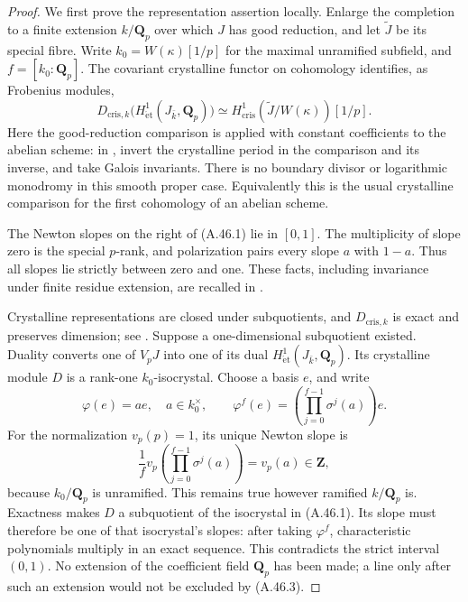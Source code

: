\begin{proof}
We first prove the representation assertion locally. Enlarge the
completion to a finite extension \(k/\mathbf Q_p\) over which \(J\)
has good reduction, and let \(\widetilde J\) be its special fibre.
Write \(k_0=W(\kappa)[1/p]\) for the maximal unramified subfield,
and \(f=[k_0:\mathbf Q_p]\). The covariant crystalline functor
on cohomology identifies, as Frobenius modules,
\[
 D_{\mathrm{cris},k}\bigl(H^1_{\acute{\mathrm e}\mathrm t}
              (J_{\bar k},\mathbf Q_p)\bigr)
       \simeq H^1_{\mathrm{cris}}(\widetilde J/W(\kappa))[1/p].
                                                        \tag{A.46.1}
\]
Here the good-reduction comparison is applied with constant
coefficients to the abelian scheme: in
\cite[Section 5, Corollary 4 and the subsequent Remarks 1--5,
printed pp.256--260]{RootFaltings2002}, invert the crystalline period
in the comparison and its inverse, and take Galois invariants.
There is no boundary divisor or logarithmic monodromy in this
smooth proper case. Equivalently this is the usual crystalline
comparison for the first cohomology of an abelian scheme.

The Newton slopes on the right of (A.46.1) lie in \([0,1]\).
The multiplicity of slope zero is the special \(p\)-rank, and
polarization pairs every slope \(a\) with \(1-a\).
Thus all slopes lie strictly between zero and one. These facts,
including invariance under finite residue extension, are recalled
in \cite[Sections 2.2.1 and 2.2.3]{RootAchterPries2013}.

Crystalline representations are closed under subquotients, and
\(D_{\mathrm{cris},k}\) is exact and preserves dimension;
see \cite[Theorem 5.2.1(1)--(3) and Proposition 9.1.6]{fghBrinonConrad}.
Suppose a one-dimensional subquotient existed. Duality converts
one of \(V_pJ\) into one of its dual
\(H^1_{\acute{\mathrm e}\mathrm t}(J_{\bar k},\mathbf Q_p)\).
Its crystalline module \(D\) is a rank-one \(k_0\)-isocrystal.
Choose a basis \(e\), and write
\[
       \varphi(e)=a e,\quad a\in k_0^\times,
       \qquad
       \varphi^f(e)=
         \left(\prod_{j=0}^{f-1}\sigma^j(a)\right)e .
                                                        \tag{A.46.2}
\]
For the normalization \(v_p(p)=1\), its unique Newton slope is
\[
 \frac1f v_p\left(\prod_{j=0}^{f-1}\sigma^j(a)\right)
                         =v_p(a)\in\mathbf Z,          \tag{A.46.3}
\]
because \(k_0/\mathbf Q_p\) is unramified. This remains true
however ramified \(k/\mathbf Q_p\) is. Exactness makes \(D\)
a subquotient of the isocrystal in (A.46.1). Its slope must
therefore be one of that isocrystal's slopes: after taking
\(\varphi^f\), characteristic polynomials multiply in an exact
sequence. This contradicts the strict interval \((0,1)\).
No extension of the coefficient field \(\mathbf Q_p\) has been
made; a line only after such an extension would not be excluded
by (A.46.3).


\end{proof}
